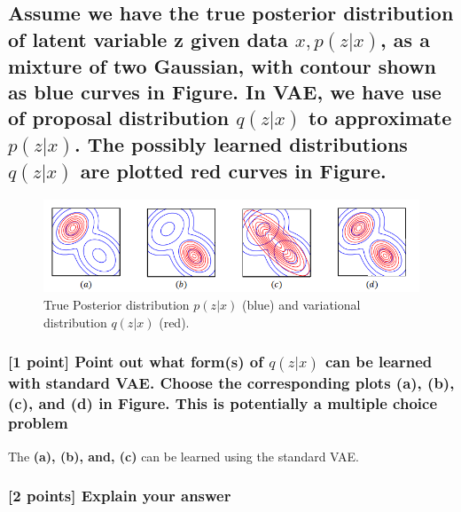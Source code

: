 \subsection{Assume we have the true posterior distribution of latent variable z given data $x, p(z|x)$, as a mixture of two Gaussian, with contour shown as blue curves in Figure. In VAE, we have use of proposal distribution $q(z|x)$ to approximate $p(z|x)$. The possibly learned distributions $q(z|x)$ are plotted red curves in Figure.}
\begin{figure}[h]
\includegraphics[width=16cm]{3.png}
\centering
\caption{True Posterior distribution $p(z|x)$ (blue) and variational distribution $q(z|x)$ (red).}
\end{figure}

\subsubsection{[1 point] Point out what form(s) of $q(z|x)$ can be learned with standard VAE. Choose the corresponding plots (a), (b), (c), and (d) in Figure. \textbf{This is potentially a multiple choice problem} \\}
The \textbf{(a), (b), and, (c)} can be learned using the standard VAE. 
\\ 
\subsubsection{[2 points] Explain your answer}


